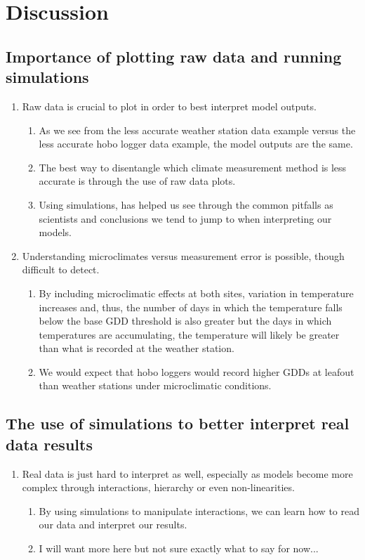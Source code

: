 \documentclass{article}\usepackage[]{graphicx}\usepackage[]{color}
\begin{document}
\section*{Discussion} 
\subsection*{Importance of plotting raw data and running simulations}
\begin{enumerate}
\item Raw data is crucial to plot in order to best interpret model outputs.
  \begin{enumerate}
  \item As we see from the less accurate weather station data example versus the less accurate hobo logger data example, the model outputs are the same.
  \item The best way to disentangle which climate measurement method is less accurate is through the use of raw data plots.
  \item Using simulations, has helped us see through the common pitfalls as scientists and conclusions we tend to jump to when interpreting our models. 
  \end{enumerate}
  
\item Understanding microclimates versus measurement error is possible, though difficult to detect. 
  \begin{enumerate}
  \item By including microclimatic effects at both sites, variation in temperature increases and, thus, the number of days in which the temperature falls below the base GDD threshold is also greater but the days in which temperatures are accumulating, the temperature will likely be greater than what is recorded at the weather station. 
  \item We would expect that hobo loggers would record higher GDDs at leafout than weather stations under microclimatic conditions.
  \end{enumerate}
\end{enumerate}


\subsection*{The use of simulations to better interpret real data results}
\begin{enumerate}
\item Real data is just hard to interpret as well, especially as models become more complex through interactions, hierarchy or even non-linearities. 
  \begin{enumerate}
  \item By using simulations to manipulate interactions, we can learn how to read our data and interpret our results.
  \item I will want more here but not sure exactly what to say for now...
  \end{enumerate}
\end{enumerate}
\end{document}
